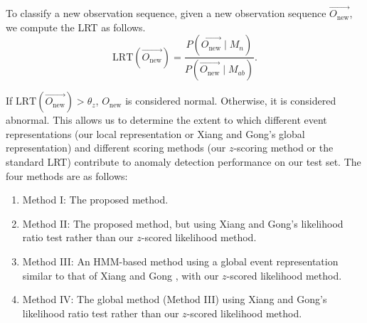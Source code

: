 To classify a new observation sequence, given a new observation 
sequence $\vec{O_{\text{new}}}$, we compute the LRT as follows.
\[
    \text{LRT}(\vec{O_{\text{new}}}) = \frac{P(\vec{O_{\text{new}}} \mid M_n)}
        {P(\vec{O_{\text{new}}} \mid M_{ab})}.
\] 

If $\text{LRT}(\vec{O_{\text{new}}}) > \theta_z$, $O_{\text{new}}$ is 
considered normal. Otherwise, it is considered abnormal.
This allows us to determine the extent to which different event 
representations (our local representation or Xiang and Gong's global 
representation) and different scoring methods (our $z$-scoring method or 
the standard LRT) contribute to anomaly detection performance on our 
test set. The four methods are as follows:

\begin{enumerate}
  \item Method I: The proposed method.
  \item Method II: The proposed method, but using Xiang and Gong's
    likelihood ratio test  rather than
    our $z$-scored likelihood method.
  \item Method III: An HMM-based method using a global event
    representation similar to that of Xiang and Gong , with our
    $z$-scored likelihood method.
  \item Method IV: The global method (Method III) using Xiang and
    Gong's likelihood ratio test rather than our $z$-scored likelihood
    method.
\end{enumerate}



